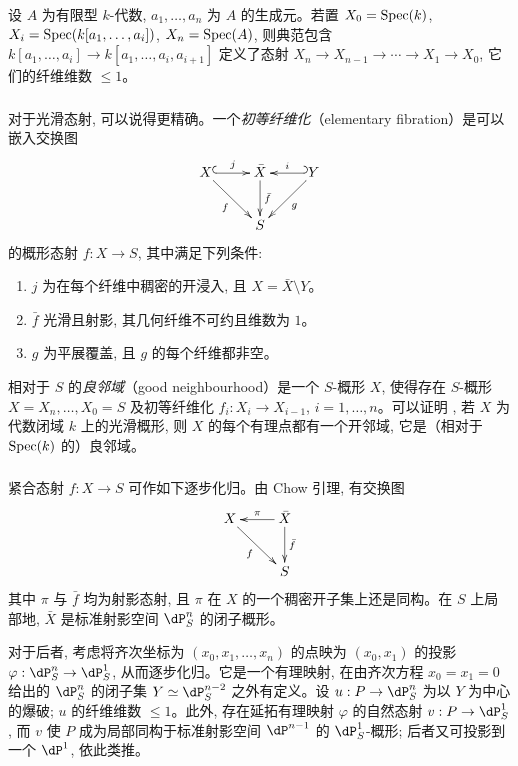 \subsubsection{}\label{I:3-4-1}

设 $A$ 为有限型 $k$-代数, $a_1,\dotsc,a_n$ 为 $A$ 的生成元。若置 $X_0=\operatorname{Spec}(k)$, $X_i=\operatorname{Spec}(k[a_1,\dotsc,a_i])$, $X_n=\operatorname{Spec}(A)$, 则典范包含 $k[a_1,\dotsc,a_i]\to k[a_1,\dotsc,a_i,a_{i+1}]$ 定义了态射 $X_n\to X_{n-1}\to\cdots\to X_1\to X_0$, 它们的纤维维数 $\leqslant1$。

\subsubsection{}\label{I:3-4-2}

对于光滑态射, 可以说得更精确。一个\emph{初等纤维化}（elementary fibration）是可以嵌入交换图
\[\xymatrix{
  X \ar@{^{(}->}[r]^-j \ar[dr]_-f
    & \bar X \ar[d]^-{\bar f}
    & \ar@{_{(}->}[l]_-i \ar[dl]^-g Y \\
  & S
}\]
的概形态射 $f:X\to S$, 其中满足下列条件:
\begin{enumerate}[\indent i)]
  \item $j$ 为在每个纤维中稠密的开浸入, 且 $X=\bar X\setminus Y$。
  \item $\bar f$ 光滑且射影, 其几何纤维不可约且维数为 $1$。
  \item $g$ 为平展覆盖, 且 $g$ 的每个纤维都非空。
\end{enumerate}

相对于 $S$ 的\emph{良邻域}（good neighbourhood）是一个 $S$-概形 $X$, 使得存在 $S$-概形 $X=X_n,\dotsc,X_0=S$ 及初等纤维化 $f_i:X_i\to X_{i-1}$, $i=1,\dotsc,n$。可以证明 \cite[XI 3.3]{sga4}, 若 $X$ 为代数闭域 $k$ 上的光滑概形, 则 $X$ 的每个有理点都有一个开邻域, 它是（相对于 $\operatorname{Spec}(k)$ 的）良邻域。

\subsubsection{}\label{I:3-4-3}

紧合态射 $f:X\to S$ 可作如下逐步化归。由 Chow 引理, 有交换图
\[\xymatrix{
  X \ar[dr]_-f
    & \ar[l]_-\pi \ar[d]^-{\bar f} \bar X \\
  & S
}\]
其中 $\pi$ 与 $\bar f$ 均为射影态射, 且 $\pi$ 在 $X$ 的一个稠密开子集上还是同构。在 $S$ 上局部地, $\bar X$ 是标准射影空间 $\dP_S^n$ 的闭子概形。

对于后者, 考虑将齐次坐标为 $(x_0,x_1,\dotsc,x_n)$ 的点映为 $(x_0,x_1)$ 的投影 $\varphi:\dP_S^n\to\dP_S^1$, 从而逐步化归。它是一个有理映射, 在由齐次方程 $x_0=x_1=0$ 给出的 $\dP_S^n$ 的闭子集 $Y\simeq\dP_S^{n-2}$ 之外有定义。设 $u:P\to\dP_S^n$ 为以 $Y$ 为中心的爆破; $u$ 的纤维维数 $\leqslant1$。此外, 存在延拓有理映射 $\varphi$ 的自然态射 $v:P\to\dP_S^1$, 而 $v$ 使 $P$ 成为局部同构于标准射影空间 $\dP^{n-1}$ 的 $\dP_S^1$-概形; 后者又可投影到一个 $\dP^1$, 依此类推。

